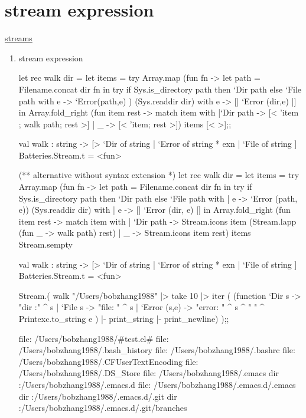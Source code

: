 \section{stream expression}

\href{http://mirror.ocamlcore.org/ocaml-tutorial.org/streams.html}{streams}

\begin{enumerate}
\item stream expression

 \begin{redcode}

let rec walk dir = 
    let items = try 
      Array.map (fun fn -> let path = Filename.concat dir fn in 
             try if Sys.is_directory path then `Dir path else `File path
             with e -> `Error(path,e) ) (Sys.readdir dir)
      with e -> [| `Error (dir,e) |] in 
      Array.fold_right 
        (fun item rest -> match item with 
            |`Dir path -> [< 'item ; walk path; rest >]
            | _ -> [< 'item; rest >]) items [< >];;

val walk :
  string ->
  [> `Dir of string | `Error of string * exn | `File of string ]
  Batteries.Stream.t = <fun>
  
(** alternative without syntax extension *)
let rec walk dir =
  let items =
    try
      Array.map
        (fun fn ->
           let path = Filename.concat dir fn   in
             try if Sys.is_directory path 
                  then `Dir path 
                  else `File path
             with | e -> `Error (path, e))
        (Sys.readdir dir)
    with | e -> [| `Error (dir, e) |]
  in
    Array.fold_right
      (fun item rest ->
         match item with
         | `Dir path ->
             Stream.icons item (Stream.lapp (fun _ -> walk path) rest)
         | _ -> Stream.icons item rest)
      items Stream.sempty

val walk :
  string ->
  [> `Dir of string | `Error of string * exn | `File of string ]
  Batteries.Stream.t = <fun>
            
Stream.( walk   "/Users/bobzhang1988"
  |> take 10 |> iter 
  (
  (function `Dir s -> "dir :" ^ s 
     | `File s -> "file: " ^ s 
     | `Error (s,e) -> "error: " ^ s ^ " " ^ Printexc.to_string e
     )  |- print_string |- print_newline)
  );;

file: /Users/bobzhang1988/#test.el#
file: /Users/bobzhang1988/.bash_history
file: /Users/bobzhang1988/.bashrc
file: /Users/bobzhang1988/.CFUserTextEncoding
file: /Users/bobzhang1988/.DS_Store
file: /Users/bobzhang1988/.emacs
dir :/Users/bobzhang1988/.emacs.d
file: /Users/bobzhang1988/.emacs.d/.emacs
dir :/Users/bobzhang1988/.emacs.d/.git
dir :/Users/bobzhang1988/.emacs.d/.git/branches
            

\end{redcode}
\end{enumerate}
